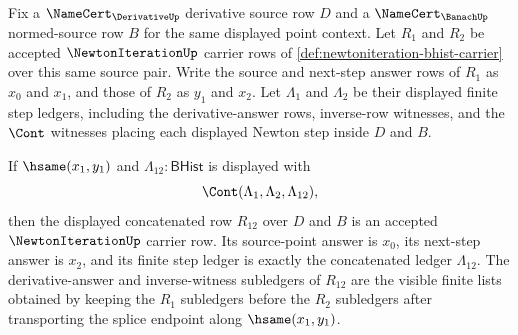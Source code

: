 \begin{theorem}
\label{thm:newtoniteration-finite-step-concatenation-closure}
Fix a $\NameCert_{\DerivativeUp}$ derivative source row $D$ and a $\NameCert_{\BanachUp}$ normed-source row $B$ for the same displayed point context. Let $R_1$ and $R_2$ be accepted $\NewtonIterationUp$ carrier rows of \autoref{def:newtoniteration-bhist-carrier} over this same source pair. Write the source and next-step answer rows of $R_1$ as $x_0$ and $x_1$, and those of $R_2$ as $y_1$ and $x_2$. Let $\Lambda_1$ and $\Lambda_2$ be their displayed finite step ledgers, including the derivative-answer rows, inverse-row witnesses, and the $\Cont$ witnesses placing each displayed Newton step inside $D$ and $B$.

If $\hsame(x_1,y_1)$ and $\Lambda_{12}:\mathsf{BHist}$ is displayed with
$$
\Cont(\Lambda_1,\Lambda_2,\Lambda_{12}),
$$
then the displayed concatenated row $R_{12}$ over $D$ and $B$ is an accepted $\NewtonIterationUp$ carrier row. Its source-point answer is $x_0$, its next-step answer is $x_2$, and its finite step ledger is exactly the concatenated ledger $\Lambda_{12}$. The derivative-answer and inverse-witness subledgers of $R_{12}$ are the visible finite lists obtained by keeping the $R_1$ subledgers before the $R_2$ subledgers after transporting the splice endpoint along $\hsame(x_1,y_1)$.
\end{theorem}
